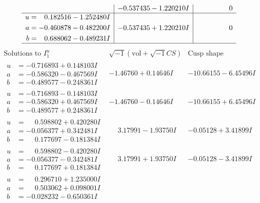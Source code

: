 \documentclass[1p]{elsarticle_modified}
\theoremstyle{definition}
\newcommand{\I}{\sqrt{-1}}
\begin{document}
$$\begin{array}{c|c|c}
 & -0.537435 - 1.220210 I & \phantom{-0.000000 } 0 \\ \hline\begin{aligned}
u &= \phantom{-}0.182516 - 1.252480 I \\
a &= -0.460878 - 0.482200 I \\
b &= \phantom{-}0.688062 - 0.489231 I\end{aligned}
 & -0.537435 + 1.220210 I & \phantom{-0.000000 } 0\\
 \hline 
 \end{array}$$\newpage$$\begin{array}{c|c|c}  
\text{Solutions to }I^u_{1}& \I (\text{vol} + \sqrt{-1}CS) & \text{Cusp shape}\\
 \hline 
\begin{aligned}
u &= -0.716893 + 0.148103 I \\
a &= -0.586320 - 0.467569 I \\
b &= -0.489577 - 0.248361 I\end{aligned}
 & -1.46760 + 0.14646 I & -10.66155 - 6.45496 I \\ \hline\begin{aligned}
u &= -0.716893 - 0.148103 I \\
a &= -0.586320 + 0.467569 I \\
b &= -0.489577 + 0.248361 I\end{aligned}
 & -1.46760 - 0.14646 I & -10.66155 + 6.45496 I \\ \hline\begin{aligned}
u &= \phantom{-}0.598802 + 0.420280 I \\
a &= -0.056377 + 0.342481 I \\
b &= \phantom{-}0.177697 - 0.181384 I\end{aligned}
 & \phantom{-}3.17991 - 1.93750 I & -0.05128 + 3.41899 I \\ \hline\begin{aligned}
u &= \phantom{-}0.598802 - 0.420280 I \\
a &= -0.056377 - 0.342481 I \\
b &= \phantom{-}0.177697 + 0.181384 I\end{aligned}
 & \phantom{-}3.17991 + 1.93750 I & -0.05128 - 3.41899 I \\ \hline\begin{aligned}
u &= \phantom{-}0.296710 + 1.235000 I \\
a &= \phantom{-}0.503062 + 0.098001 I \\
b &= -0.028232 - 0.650361 I\end{aligned}

\end{array}$$
\end{document}
